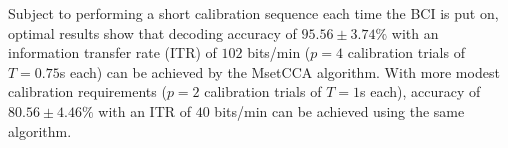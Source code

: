 \noindent
Subject to performing a short calibration sequence each time the BCI is put on, optimal results show that decoding accuracy of $95.56 \pm 3.74\%$ with an information transfer rate (ITR) of $102$ bits/min ($p=4$ calibration trials of $T=0.75$s each) can be achieved by the MsetCCA algorithm. With more modest calibration requirements ($p=2$ calibration trials of $T=1$s each), accuracy of $80.56 \pm 4.46\%$ with an ITR of $40$ bits/min can be achieved using the same algorithm.
\vspace{0.4cm}

\noindent




